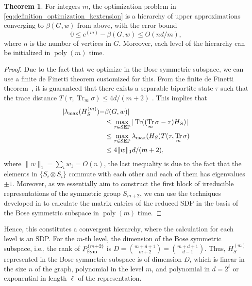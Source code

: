 \documentclass[
12pt,
prx,
aps,
reprint,
a4paper,
longbibliograph,
nofootinbib,
nobibnotes,
superscriptaddress
]{revtex4-2}
\theoremstyle{definition}
\newtheorem{theorem}{Theorem}
\DeclareMathOperator\tr{Tr}
\begin{document}
\begin{theorem}
\label{thm:deFinetti_approximation}
For integers $m$, the optimization problem in \eqref{eq:definition_optimization_kextension} is a
hierarchy of upper approximations converging to $\beta(G,w)$ from above, with the error bound 
\begin{equation}
  0 \leq c^{(m)} - \beta(G,w) \leq O(nd/m),
\end{equation}
where $n$ is the number of vertices in $G$. Moreover, each level of the hierarchy can be initialized in $\operatorname{poly}(m)$ time.
\end{theorem}
\begin{proof}
Due to the fact that we optimize in the Bose symmetric subspace, we can use a finite de Finetti theorem customized for this.
From the finite de Finetti theorem~\cite[Thm.~II.8]{Christandl2007}, it is guaranteed that there exists a separable bipartite state $\tau$ such that the trace distance $T(\tau,\tr_m \sigma) \le 4d/(m+2)$ .
This implies that 
\begin{equation}
\begin{aligned}\label{eq:mfdiff}
  |\lambda_{\max}(H_S^{(m)}) -& \beta(G,w)| \\
	&\le \max_{\tau\in {\rm SEP}} |\tr((\tr_m \sigma - \tau)H_S)| \\
	&\le \max_{\tau\in {\rm SEP}} \lambda_{\max}(H_S) T(\tau, \tr_m \sigma) \\
	&\le 4 \|w\|_1 d/(m+2),
\end{aligned}
\end{equation}
where $\|w\|_1 = \sum_i w_1 = O(n)$, the last inequality is due to the fact that the elements in $\{S_i\otimes S_i\}$ commute with each other and each of them has eigenvalues $\pm 1$. Moreover, as we essentially aim to construct the first block of irreducible representations of the symmetric group $S_{m+2}$, we can use the techniques developed in \cite{Litjens2016} to calculate the matrix entries of the reduced SDP in the basis of the Bose symmetric subspace in $\operatorname{poly}(m)$ time. 
\end{proof}
Hence, this constitutes a convergent hierarchy, where the calculation for each level is an SDP.
For the $m$-th level, the dimension of the Bose symmetric subspace, i.e., the rank of $P_{\rm Sym}^{(m+2)}$ is $D = \binom{m+d+1}{m+2} = \binom{m+d+1}{d-1}$. Thus, $H_S^{(m)}$ represented in the Bose symmetric subspace is of dimension $D$, which is linear in the size $n$ of the graph,  polynomial in the level $m$, and polynomial in $d=2^\ell$ or exponential in length $\ell$ of the representation.
\end{document}
